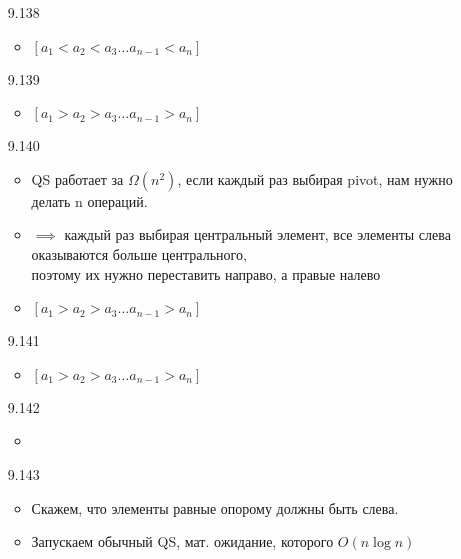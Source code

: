 \documentclass{article}
\author{Бугрий Илья M3134}
\date{November 2023}
\begin{document}
\begin{enumerate}
    \item [9.138]
    \begin{itemize}
        \item $[a_1 < a_2 < a_3 \dots a_{n-1} < a_{n}]$
    \end{itemize}

    \item [9.139]
    \begin{itemize}
        \item $[a_1 > a_2 > a_3 \dots a_{n-1} > a_{n}]$
    \end{itemize}

    \item [9.140]
    \begin{itemize}
        \item QS работает за $\Omega (n^2)$, если каждый раз выбирая pivot, нам нужно делать n операций. \\
        \item $\implies$ каждый раз выбирая центральный элемент, все элементы слева оказываются больше центрального,\\
         поэтому их нужно переставить направо, а правые налево \\
        \item $[a_1 > a_2 > a_3 \dots a_{n-1} > a_{n}]$
    \end{itemize}

    \item [9.141]
    \begin{itemize}
        \item $[a_1 > a_2 > a_3 \dots a_{n-1} > a_{n}]$
    \end{itemize}

    \item [9.142]
    \begin{itemize}
        \item 
    \end{itemize}

    \item [9.143]
    \begin{itemize}
        \item  Скажем, что элементы равные опорому должны быть слева.
        \item Запускаем обычный QS, мат. ожидание, которого $O(n \log{n})$
    \end{itemize}


\end{enumerate}
\end{document}
